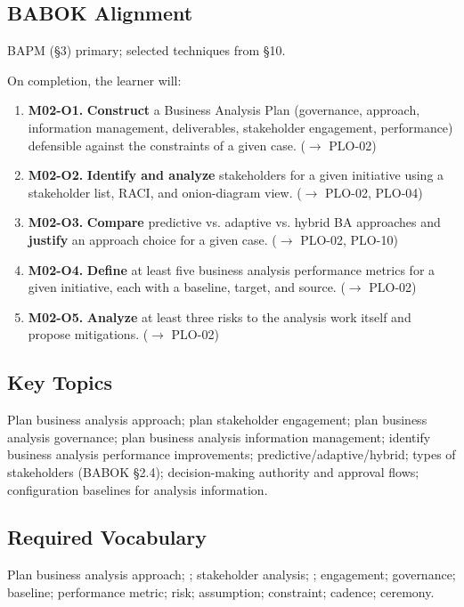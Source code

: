 \documentclass[11pt,letterpaper,oneside]{report}
\begin{document}
\subsection*{BABOK Alignment}
BAPM (\S3) primary; selected techniques from \S10.

\begin{outcomes}
On completion, the learner will:
\begin{enumerate}
  \item \textbf{M02-O1.} \textbf{Construct} a Business Analysis Plan (governance, approach, information management, deliverables, stakeholder engagement, performance) defensible against the constraints of a given case. ($\to$ PLO-02)
  \item \textbf{M02-O2.} \textbf{Identify and analyze} stakeholders for a given initiative using a stakeholder list, RACI, and onion-diagram view. ($\to$ PLO-02, PLO-04)
  \item \textbf{M02-O3.} \textbf{Compare} predictive vs. adaptive vs. hybrid BA approaches and \textbf{justify} an approach choice for a given case. ($\to$ PLO-02, PLO-10)
  \item \textbf{M02-O4.} \textbf{Define} at least five business analysis performance metrics for a given initiative, each with a baseline, target, and source. ($\to$ PLO-02)
  \item \textbf{M02-O5.} \textbf{Analyze} at least three risks to the analysis work itself and propose mitigations. ($\to$ PLO-02)
\end{enumerate}
\end{outcomes}

\subsection*{Key Topics}
Plan business analysis approach; plan stakeholder engagement; plan business analysis governance; plan business analysis information management; identify business analysis performance improvements; predictive/adaptive/hybrid; types of stakeholders (BABOK \S2.4); decision-making authority and approval flows; configuration baselines for analysis information.

\subsection*{Required Vocabulary}
Plan business analysis approach; ; stakeholder analysis; ; engagement; governance; baseline; performance metric; risk; assumption; constraint; cadence; ceremony.
\end{document}
